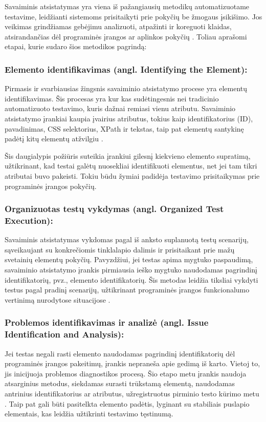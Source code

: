 \documentclass[
]{VUMIFPSkursinis}
\begin{document}
Savaiminis atsistatymas yra viena iš pažangiausių metodikų automatizuotame testavime, leidžianti sistemoms prisitaikyti prie pokyčių be žmogaus įsikišimo. Jos veikimas grindžiamas gebėjimu analizuoti, atpažinti ir koreguoti klaidas, atsirandančias dėl programinės įrangos ar aplinkos pokyčių \cite{lemos2020}. Toliau aprašomi etapai, kurie sudaro šios metodikos pagrindą:

\subsubsection{Elemento identifikavimas (angl. Identifying the Element):} Pirmasis ir svarbiausias žingsnis savaiminio atsistatymo procese yra elementų identifikavimas. Šis procesas yra kur kas sudėtingesnis nei tradicinio automatizuoto testavimo, kuris dažnai remiasi vienu atributu. Savaiminio atsistatymo įrankiai kaupia įvairius atributus, tokius kaip identifikatorius (ID), pavadinimas, CSS selektorius, XPath ir tekstas, taip pat elementų santykinę padėtį kitų elementų atžvilgiu \cite{camara2019}.

Šis daugialypis požiūris suteikia įrankiui gilesnį kiekvieno elemento supratimą, užtikrinant, kad testai galėtų nuosekliai identifikuoti elementus, net jei tam tikri atributai buvo pakeisti. Tokiu būdu žymiai padidėja testavimo prisitaikymas prie programinės įrangos pokyčių.
    
\subsubsection{Organizuotas testų vykdymas (angl. Organized Test Execution):} Savaiminis atsistatymas vykdomas pagal iš anksto suplanuotą testų scenarijų, sąveikaujant su konkrečiomis tinklalapio dalimis ir prisitaikant prie mažų svetainių elementų pokyčių. Pavyzdžiui, jei testas apima mygtuko paspaudimą, savaiminio atsistatymo įrankis pirmiausia ieško mygtuko naudodamas pagrindinį identifikatorių, pvz., elemento identifikatorių. Šis metodas leidžia tiksliai vykdyti testus pagal pradinį scenarijų, užtikrinant programinės įrangos funkcionalumo vertinimą nurodytose situacijose \cite{garlan2004}.
    
\subsubsection{Problemos identifikavimas ir analizė (angl. Issue Identification and Analysis):} Jei testas negali rasti elemento naudodamas pagrindinį identifikatorių dėl programinės įrangos pakeitimų, įrankis nepraneša apie gedimą iš karto. Vietoj to, jis inicijuoja problemos diagnostikos procesą. Šio etapo metu įrankis naudoja atsarginius metodus, siekdamas surasti trūkstamą elementą, naudodamas antrinius identifikatorius ar atributus, užregistruotus pirminio testo kūrimo metu \cite{harman2012}. Taip pat gali būti pasitelkta elemento padėtis, lyginant su stabiliais puslapio elementais, kas leidžia užtikrinti testavimo tęstinumą.
\end{document}
